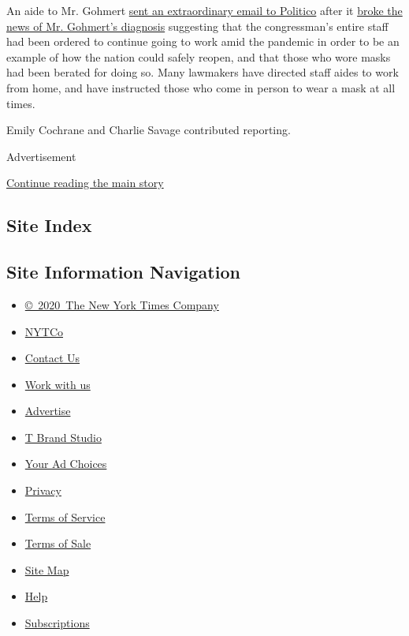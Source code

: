 An aide to Mr. Gohmert
\href{https://twitter.com/JakeSherman/status/1288524502649966592?s=20}{sent
an extraordinary email to Politico} after it
\href{https://www.politico.com/news/2020/07/29/louis-gohmert-who-refused-to-wear-a-mask-tests-positive-for-coronavirus-386076}{broke
the news of Mr. Gohmert's diagnosis} suggesting that the congressman's
entire staff had been ordered to continue going to work amid the
pandemic in order to be an example of how the nation could safely
reopen, and that those who wore masks had been berated for doing so.
Many lawmakers have directed staff aides to work from home, and have
instructed those who come in person to wear a mask at all times.

Emily Cochrane and Charlie Savage contributed reporting.

Advertisement

\protect\hyperlink{after-bottom}{Continue reading the main story}

\hypertarget{site-index}{%
\subsection{Site Index}\label{site-index}}

\hypertarget{site-information-navigation}{%
\subsection{Site Information
Navigation}\label{site-information-navigation}}

\begin{itemize}
\tightlist
\item
  \href{https://help.nytimes.com/hc/en-us/articles/115014792127-Copyright-notice}{©~2020~The
  New York Times Company}
\end{itemize}

\begin{itemize}
\tightlist
\item
  \href{https://www.nytco.com/}{NYTCo}
\item
  \href{https://help.nytimes.com/hc/en-us/articles/115015385887-Contact-Us}{Contact
  Us}
\item
  \href{https://www.nytco.com/careers/}{Work with us}
\item
  \href{https://nytmediakit.com/}{Advertise}
\item
  \href{http://www.tbrandstudio.com/}{T Brand Studio}
\item
  \href{https://www.nytimes.com/privacy/cookie-policy\#how-do-i-manage-trackers}{Your
  Ad Choices}
\item
  \href{https://www.nytimes.com/privacy}{Privacy}
\item
  \href{https://help.nytimes.com/hc/en-us/articles/115014893428-Terms-of-service}{Terms
  of Service}
\item
  \href{https://help.nytimes.com/hc/en-us/articles/115014893968-Terms-of-sale}{Terms
  of Sale}
\item
  \href{https://spiderbites.nytimes.com}{Site Map}
\item
  \href{https://help.nytimes.com/hc/en-us}{Help}
\item
  \href{https://www.nytimes.com/subscription?campaignId=37WXW}{Subscriptions}
\end{itemize}

